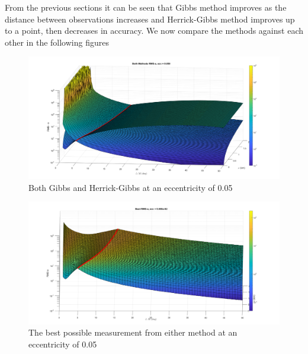 \documentclass[12pt]{article}
\begin{document}
	From the previous sections it can be seen  that Gibbs method improves as the distance between observations increases and Herrick-Gibbs method improves up to a point, then decreases in accuracy. We now compare the methods against each other in the following figures 
	\begin{figure}[H]
		\centering
		\includegraphics[width=0.7\linewidth]{bothMethods_e_05}
		\caption{Both Gibbs and Herrick-Gibbs at an eccentricity of 0.05}
		\label{fig:bothmethodse05}
	\end{figure}
	\begin{figure}[H]
		\centering
		\includegraphics[width=0.7\linewidth]{bestMethods_e_05}
		\caption{The best possible measurement from either method at an eccentricity of 0.05}
		\label{fig:bestmethodse05}
	\end{figure}
\end{document}

